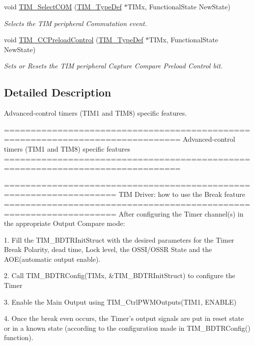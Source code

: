 \begin{DoxyCompactItemize}
void \hyperlink{group___t_i_m___group4_gaff2e7f9959b1b36e830df028c14accc8}{T\+I\+M\+\_\+\+Select\+C\+OM} (\hyperlink{struct_t_i_m___type_def}{T\+I\+M\+\_\+\+Type\+Def} $\ast$T\+I\+Mx, Functional\+State New\+State)
\begin{DoxyCompactList}\small\item\em Selects the T\+IM peripheral Commutation event. \end{DoxyCompactList}\item 
void \hyperlink{group___t_i_m___group4_ga0a935254e44312b1d78e8684a58db3c1}{T\+I\+M\+\_\+\+C\+C\+Preload\+Control} (\hyperlink{struct_t_i_m___type_def}{T\+I\+M\+\_\+\+Type\+Def} $\ast$T\+I\+Mx, Functional\+State New\+State)
\begin{DoxyCompactList}\small\item\em Sets or Resets the T\+IM peripheral Capture Compare Preload Control bit. \end{DoxyCompactList}\end{DoxyCompactItemize}


\subsection{Detailed Description}
Advanced-\/control timers (T\+I\+M1 and T\+I\+M8) specific features. 

\begin{DoxyVerb} ===============================================================================
          Advanced-control timers (TIM1 and TIM8) specific features
 ===============================================================================  
  
       ===================================================================      
              TIM Driver: how to use the Break feature
       =================================================================== 
       After configuring the Timer channel(s) in the appropriate Output Compare mode: 
                         
       1. Fill the TIM_BDTRInitStruct with the desired parameters for the Timer
          Break Polarity, dead time, Lock level, the OSSI/OSSR State and the 
          AOE(automatic output enable).
               
       2. Call TIM_BDTRConfig(TIMx, &TIM_BDTRInitStruct) to configure the Timer
          
       3. Enable the Main Output using TIM_CtrlPWMOutputs(TIM1, ENABLE) 
          
       4. Once the break even occurs, the Timer's output signals are put in reset
          state or in a known state (according to the configuration made in
          TIM_BDTRConfig() function).\end{DoxyVerb}
 


